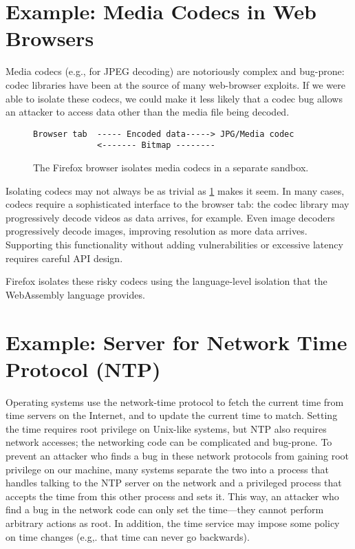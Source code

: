 \section{Example: Media Codecs in Web Browsers}\label{sec:split:codec}
Media codecs (e.g., for JPEG decoding) are notoriously complex and bug-prone:
codec libraries have been at the source of many web-browser exploits. 
If we were able to isolate these codecs, we could
make it less likely that a codec bug allows an attacker to
access data other than the media file being decoded.

\begin{figure}
\begin{verbatim}
Browser tab  ----- Encoded data-----> JPG/Media codec
             <------- Bitmap -------- 
\end{verbatim}
\caption{The Firefox browser isolates media codecs
in a separate sandbox.}\label{fig:codec}
\end{figure}

Isolating codecs may not always be as trivial as \cref{fig:codec} makes it seem.
In many cases, codecs require a sophisticated interface to the browser tab: the
codec library may progressively decode videos as data arrives, for example. 
Even image decoders progressively decode images, improving resolution as more data arrives. Supporting this functionality without adding vulnerabilities or excessive 
latency requires careful API design.

Firefox isolates these risky codecs using
the language-level isolation that the WebAssembly language provides.

\section{Example: Server for Network Time Protocol (NTP)}
Operating systems use the network-time protocol
to fetch the current time from time servers on 
the Internet, and to update the current
time to match. 
Setting the time requires root
privilege on Unix-like systems, but NTP also
requires network accesses; 
the networking code can be complicated
and bug-prone. To prevent an attacker who finds
a bug in these network protocols from gaining root
privilege on our machine, many systems separate
the two into a process that handles talking to the
NTP server on the network and a privileged process
that accepts the time from this other process and
sets it. This way, an attacker who find a bug in
the network code can only set the time---they
cannot perform arbitrary actions as root.
In addition, the time service may impose some
policy on time changes (e.g,. that time can never
go backwards). 

